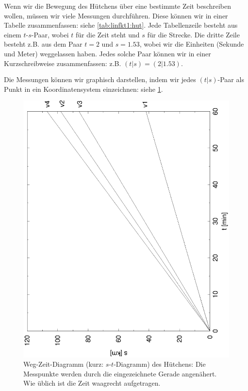 \documentclass[%
11pt,%
twoside,%
titlepage,%
german,%
headsepline%
]{scrartcl}
\begin{document}
Wenn wir die Bewegung des H\"utchens \"uber eine bestimmte Zeit beschreiben wollen, m\"ussen wir viele Messungen durchf\"uhren. Diese k\"onnen wir in einer Tabelle zusammenfassen: siehe \ref{tab:linfkt1:hut}. Jede Tabellenzeile besteht aus einem $t$-$s$-Paar, wobei $t$ f\"ur die Zeit steht und $s$ f\"ur die Strecke. Die dritte Zeile besteht z.B. aus dem Paar $t=2$ und $s=1.53$, wobei wir die Einheiten (Sekunde und Meter) weggelassen haben. Jedes solche Paar k\"onnen wir in einer Kurzschreibweise zusammenfassen: z.B. $(t|s)=(2|1.53)$. 

Die Messungen k\"onnen wir graphisch darstellen, indem wir jedes $(t|s)$-Paar als Punkt in ein Koordinatensystem einzeichnen: siehe \ref{fig:linfkt1:sthut}.



\begin{figure}[b!]
\centering
\includegraphics[width=\columnwidth]{pictures/vierzug.eps}
\caption{Weg-Zeit-Diagramm (kurz: $s$-$t$-Diagramm) des H\"utchens: Die Messpunkte werden durch die eingezeichnete Gerade angen\"ahert. Wie \"ublich ist die Zeit waagrecht aufgetragen.}
\label{fig:linfkt1:sthut}
\end{figure}
\end{document}
